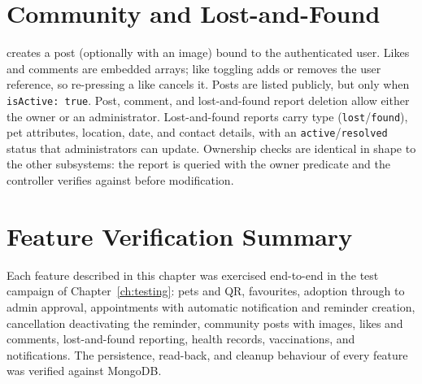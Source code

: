 \section{Community and Lost-and-Found}

 creates a post (optionally with an image) bound to
the authenticated user. Likes and comments are embedded arrays; like toggling
adds or removes the user reference, so re-pressing a like cancels it. Posts are
listed publicly, but only when \texttt{isActive: true}. Post, comment, and
lost-and-found report deletion allow either the owner or an administrator.
Lost-and-found reports carry type (\texttt{lost}/\texttt{found}), pet
attributes, location, date, and contact details, with an
\texttt{active}/\texttt{resolved} status that administrators can update.
Ownership checks are identical in shape to the other subsystems: the report is
queried with the owner predicate and the controller verifies
 against  before modification.

\section{Feature Verification Summary}

Each feature described in this chapter was exercised end-to-end in the test
campaign of Chapter~\ref{ch:testing}: pets and QR, favourites, adoption through
to admin approval, appointments with automatic notification and reminder
creation, cancellation deactivating the reminder, community posts with images,
likes and comments, lost-and-found reporting, health records, vaccinations, and
notifications. The persistence, read-back, and cleanup behaviour of every
feature was verified against MongoDB.